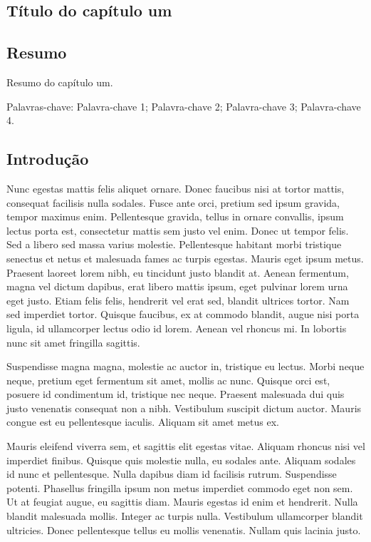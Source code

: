 \documentclass[book,A4paper,10pt,twoside,oldfontcommands]{memoir}\usepackage[]{graphicx}\usepackage[usenames,dvipsnames]{color}
\begin{document}
\begin{btUnit}
\chapter{Título do capítulo um}



\section*{Resumo}

Resumo do capítulo um. \newline

\noindent Palavras-chave: Palavra-chave 1; Palavra-chave 2;
Palavra-chave 3; Palavra-chave 4.

\section{Introdução}

Nunc egestas mattis felis aliquet ornare. Donec faucibus nisi at
tortor mattis, consequat facilisis nulla sodales. Fusce ante orci,
pretium sed ipsum gravida, tempor maximus enim. Pellentesque gravida,
tellus in ornare convallis, ipsum lectus porta est, consectetur mattis
sem justo vel enim. Donec ut tempor felis. Sed a libero sed massa
varius molestie. Pellentesque habitant morbi tristique senectus et
netus et malesuada fames ac turpis egestas. Mauris eget ipsum metus.
Praesent laoreet lorem nibh, eu tincidunt justo blandit at. Aenean
fermentum, magna vel dictum dapibus, erat libero mattis ipsum, eget
pulvinar lorem urna eget justo. Etiam felis felis, hendrerit vel erat
sed, blandit ultrices tortor. Nam sed imperdiet tortor. Quisque
faucibus, ex at commodo blandit, augue nisi porta ligula, id
ullamcorper lectus odio id lorem. Aenean vel rhoncus mi. In lobortis
nunc sit amet fringilla sagittis.

Suspendisse magna magna, molestie ac auctor in, tristique eu lectus.
Morbi neque neque, pretium eget fermentum sit amet, mollis ac nunc.
Quisque orci est, posuere id condimentum id, tristique nec neque.
Praesent malesuada dui quis justo venenatis consequat non a nibh.
Vestibulum suscipit dictum auctor. Mauris congue est eu pellentesque
iaculis. Aliquam sit amet metus ex.

Mauris eleifend viverra sem, et sagittis elit egestas vitae. Aliquam
rhoncus nisi vel imperdiet finibus. Quisque quis molestie nulla, eu
sodales ante. Aliquam sodales id nunc et pellentesque. Nulla dapibus
diam id facilisis rutrum. Suspendisse potenti. Phasellus fringilla
ipsum non metus imperdiet commodo eget non sem. Ut at feugiat augue,
eu sagittis diam. Mauris egestas id enim et hendrerit. Nulla blandit
malesuada mollis. Integer ac turpis nulla. Vestibulum ullamcorper
blandit ultricies. Donec pellentesque tellus eu mollis venenatis.
Nullam quis lacinia justo.


\end{btUnit}
\end{document}
